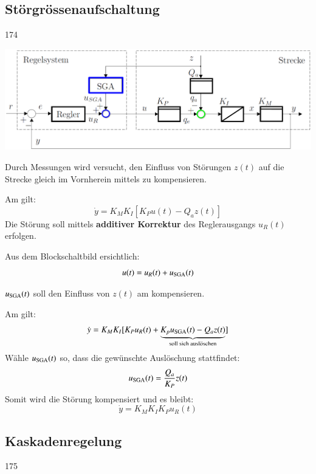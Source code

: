 \subsection{Störgrössenaufschaltung}{174}

\begin{minipage}[c]{0.55\columnwidth}
    \includegraphics[width=\columnwidth]{images/stoergroessenaufschaltung.png}
\end{minipage}
\hfill
\begin{minipage}[c]{0.43\columnwidth}
    Durch Messungen wird versucht, den Einfluss von Störungen $z(t)$ auf die Strecke gleich im Vornherein mittels 
     zu kompensieren.
\end{minipage}

\vspace{0.2cm}

\begin{minipage}[t]{0.48\columnwidth}
    Am  gilt:
    $$ \dot{y} = K_M K_I [K_P u(t) - Q_a z(t)] $$
    Die Störung soll mittels \textbf{additiver Korrektur} des Reglerausgangs $u_R(t)$ erfolgen. 

    Aus dem Blockschaltbild ersichtlich:
    $$u(t) = u_R(t) + u_{\rm SGA}(t) $$

    $u_{\rm SGA}(t)$ soll den Einfluss von $z(t)$ am  kompensieren.
\end{minipage}
\hfill
\begin{minipage}[t]{0.48\columnwidth}
    Am  gilt:
    $$ \dot{y} = K_M K_I [K_P u_R(t) + \underbrace{ K_p u_{\rm SGA}(t) - Q_a z(t)}_{\text{soll sich auslöschen}}] $$
    Wähle $u_{\rm SGA}(t)$ so, dass die gewünschte Auslöschung stattfindet:
    $$ u_{\rm SGA}(t) = \frac{Q_a}{K_P} z(t) $$
    Somit wird die Störung kompensiert und es bleibt:
    $$ \dot{y} = K_M K_I K_P u_R(t)$$
\end{minipage}


\subsection{Kaskadenregelung}{175}

